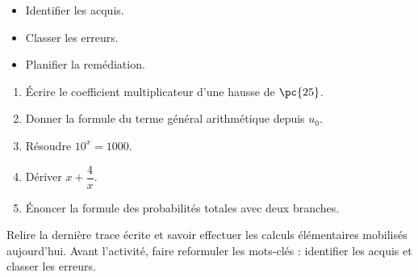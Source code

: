 \begin{objectives}\begin{itemize}\item Identifier les acquis.\item Classer les erreurs.\item Planifier la remédiation.\end{itemize}\end{objectives}
\begin{fluency}\begin{enumerate}\item Écrire le coefficient multiplicateur d'une hausse de $\pc{25}$. \item Donner la formule du terme général arithmétique depuis $u_0$. \item Résoudre $10^x=1000$. \item Dériver $x+\dfrac4x$. \item Énoncer la formule des probabilités totales avec deux branches. \end{enumerate}\end{fluency}
\begin{prerequisites}Relire la dernière trace écrite et savoir effectuer les calculs élémentaires mobilisés aujourd'hui. Avant l'activité, faire reformuler les mots-clés : identifier les acquis et classer les erreurs.\end{prerequisites}

